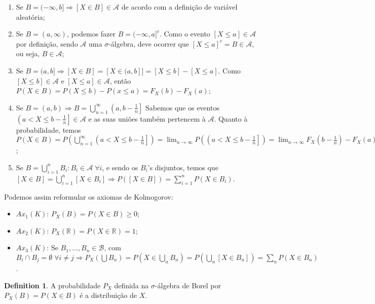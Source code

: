 \documentclass[
]{article}
\providecommand{\tightlist}{%
  \setlength{\itemsep}{0pt}\setlength{\parskip}{0pt}}
\theoremstyle{definition}
\newtheorem{definition}{Definition}[section]
\theoremstyle{definition}
\theoremstyle{definition}
\theoremstyle{definition}
\theoremstyle{remark}
\begin{document}
\begin{enumerate}
\def\labelenumi{\arabic{enumi}.}
\tightlist
\item
  Se \(B = (-\infty, b] \Rightarrow [X \in B] \in \mathcal{A}\) de acordo com a definição de variável aleatória;
\item
  Se \(B = (a, \infty)\), podemos fazer \(B = (-\infty, a]^{c}\). Como o evento \([X \le a] \in \mathcal{A}\) por definição, sendo \(\mathcal{A}\) uma \(\sigma\)-álgebra, deve ocorrer que \([X \le a]^{c} = B \in \mathcal{A}\), ou seja, \(B \in \mathcal{A}\);
\item
  Se \(B = (a, b] \Rightarrow [X \in B] = [X \in (a,b]] = [X \le b] - [X \le a]\). Como \([X \le b] \in \mathcal{A}\) e \([X \le a] \in \mathcal{A}\), então \(P(X \in B) = P(X \le b) - P(x \le a) = F_{X}(b) - F_{X}(a)\);
\item
  Se \(B = (a,b) \Rightarrow B = \bigcup_{n=1}^{\infty}\left(a,b-\frac{1}{n}\right]\) Sabemos que os eventos \(\left(a < X \le b - \frac{1}{n}\right] \in \mathcal{A}\) e as suas uniões também pertencem à \(\mathcal{A}\). Quanto à probabilidade, temos \(P(X \in B) = P\left(\bigcup_{n=1}^{\infty}\left(a < X \le b - \frac{1}{n}\right]\right) = \lim_{n \to \infty}P\left(\left(a < X \le b - \frac{1}{n}\right]\right) = \lim_{n \to \infty}F_{X}\left(b - \frac{1}{n}\right) - F_{X}(a) = F_{X}(b^{-}) - F_{X}(a)\);
\item
  Se \(B = \bigcup_{i = 1}^{n}B_{i}:B_{i} \in \mathcal{A}\; \forall i\), e sendo os \(B_{i}\)'s disjuntos, temos que \([X \in B] = \bigcup_{i=1}^{n}[X \in B_{i}] \Rightarrow P([X \in B]) = \sum_{i=1}^{n}P(X \in B_{i})\).
\end{enumerate}

Podemos assim reformular os axiomas de Kolmogorov:

\begin{itemize}
\tightlist
\item
  \(Ax_{1}(K)\): \(P_{X}(B) = P(X \in B) \ge 0\);
\item
  \(Ax_{2}(K)\): \(P_{X}(\mathbb{R}) = P(X \in \mathbb{R}) = 1\);
\item
  \(Ax_{3}(K)\): Se \(B_{1}, \ldots, B_{n} \in \mathcal{B}\), com \(B_{i} \cap B_{j} = \emptyset \; \forall i \neq j \Rightarrow P_{X}(\bigcup B_{n}) = P(X \in \bigcup_{n}B_{n}) = P(\bigcup_{n}[X \in B_{n}]) = \sum_{n}P(X \in B_{n})\).
\end{itemize}

\begin{definition}
A probabilidade \(P_{X}\) definida na \(\sigma\)-álgebra de Borel por \(P_{X}(B) = P(X \in B)\) é a distribuição de \(X\).
\end{definition}
\end{document}
